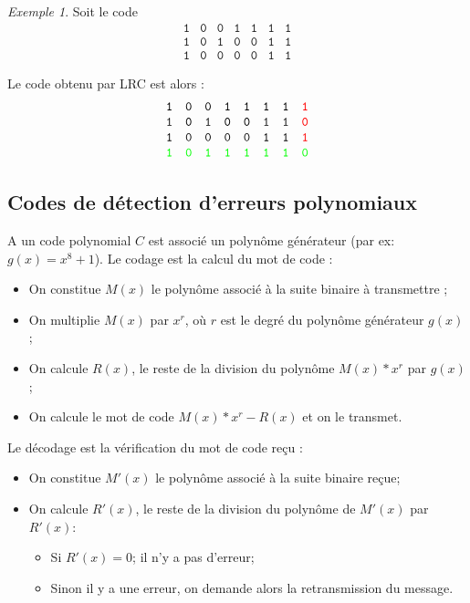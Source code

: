 \documentclass[11pt,english,french]{scrreprt}
\theoremstyle{remark}
\newtheorem*{ex*}{Exemple}
\theoremstyle{definition}
\begin{document}
\begin{ex*}
	Soit le code 
	\[
		\begin{array}{ccccccc}
		\mathtt{1} & \mathtt{0} & \mathtt{0} & \mathtt{1} & \mathtt{1} & \mathtt{1} & \mathtt{1}\\
		\mathtt{1} & \mathtt{0} & \mathtt{1} & \mathtt{0} & \mathtt{0} & \mathtt{1} & \mathtt{1}\\
		\mathtt{1} & \mathtt{0} & \mathtt{0} & \mathtt{0} & \mathtt{0} & \mathtt{1} & \mathtt{1}
		\end{array}
	\]
	
	Le code obtenu par LRC est alors :
	\[
		\begin{array}{cccccccc}
		\mathtt{1} & \mathtt{0} & \mathtt{0} & \mathtt{1} & \mathtt{1} & \mathtt{1} & \mathtt{1} & {\color{red}\mathtt{1}}\\
		\mathtt{1} & \mathtt{0} & \mathtt{1} & \mathtt{0} & \mathtt{0} & \mathtt{1} & \mathtt{1} & {\color{red}\mathtt{0}}\\
		\mathtt{1} & \mathtt{0} & \mathtt{0} & \mathtt{0} & \mathtt{0} & \mathtt{1} & \mathtt{1} & {\color{red}\mathtt{1}}\\
		{\color{green}\mathtt{1}} & {\color{green}\mathtt{0}} & {\color{green}\mathtt{1}} & {\color{green}\mathtt{1}} & {\color{green}\mathtt{1}} & {\color{green}\mathtt{1}} & {\color{green}\mathtt{1}} & {\color{green}\mathtt{0}}\end{array}
	\]
\end{ex*}

\subsection{Codes de détection d'erreurs polynomiaux}

A un code polynomial $C$ est associé un polynôme générateur (par ex: $g(x) = x^8 + 1$).
Le codage est la calcul du mot de code :\begin{itemize}
	\item On constitue $M(x)$ le polynôme associé à la suite binaire à transmettre ;
	\item On multiplie $M(x)$ par $x^r$, où $r$ est le degré du polynôme générateur $g(x)$;
	\item On calcule $R(x)$, le reste de la division du polynôme $M(x)* x^r$ par $g(x)$;
	\item On calcule le mot de code  $M(x)* x^r  - R(x)$ et on le transmet.
\end{itemize}

\vspace{10pt}
Le décodage est la vérification du mot de code reçu :\begin{itemize}
	\item On constitue $M'(x)$ le polynôme associé à la suite binaire reçue;
	\item On calcule $R'(x)$, le reste de la division du polynôme de $M'(x)$ par $R'(x)$:\begin{itemize}
		\item Si $R'(x) = 0$; il n'y a pas d'erreur;
		\item Sinon il y a une erreur, on demande alors la retransmission du message.
	\end{itemize}
\end{itemize}
\end{document}
